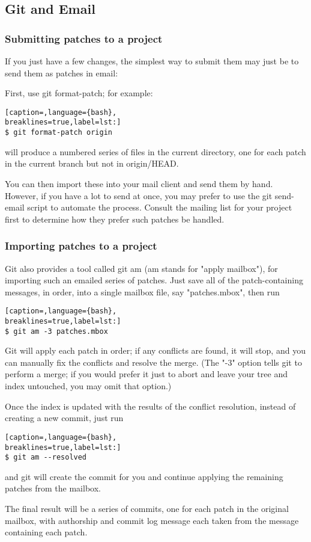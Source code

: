\subsection{Git and Email}
\subsubsection{Submitting patches to a project}
If you just have a few changes, the simplest way to submit them may just be to
send them as patches in email:

First, use git format-patch; for example:
\lstset{basicstyle=\scriptsize, numbers=none, captionpos=b, tabsize=4}
\begin{lstlisting}[caption=,language={bash},
breaklines=true,label=lst:]
$ git format-patch origin
\end{lstlisting}

will produce a numbered series of files in the current directory, one for each
patch in the current branch but not in origin/HEAD.

You can then import these into your mail client and send them by hand. However,
if you have a lot to send at once, you may prefer to use the git send-email
script to automate the process. Consult the mailing list for your project first
to determine how they prefer such patches be handled.

\subsubsection{Importing patches to a project}
Git also provides a tool called git am (am stands for "apply mailbox"), for
importing such an emailed series of patches. Just save all of the
patch-containing messages, in order, into a single mailbox file, say
"patches.mbox", then run
\lstset{basicstyle=\scriptsize, numbers=none, captionpos=b, tabsize=4}
\begin{lstlisting}[caption=,language={bash},
breaklines=true,label=lst:]
$ git am -3 patches.mbox
\end{lstlisting}

Git will apply each patch in order; if any conflicts are found, it will stop,
and you can manually fix the conflicts and resolve the merge. (The "-3" option
tells git to perform a merge; if you would prefer it just to abort and leave
your tree and index untouched, you may omit that option.)

Once the index is updated with the results of the conflict resolution, instead
of creating a new commit, just run
\lstset{basicstyle=\scriptsize, numbers=none, captionpos=b, tabsize=4}
\begin{lstlisting}[caption=,language={bash},
breaklines=true,label=lst:]
$ git am --resolved
\end{lstlisting}

and git will create the commit for you and continue applying the remaining patches from the mailbox.

The final result will be a series of commits, one for each patch in the original mailbox, with authorship and commit log message each taken from the message containing each patch.
